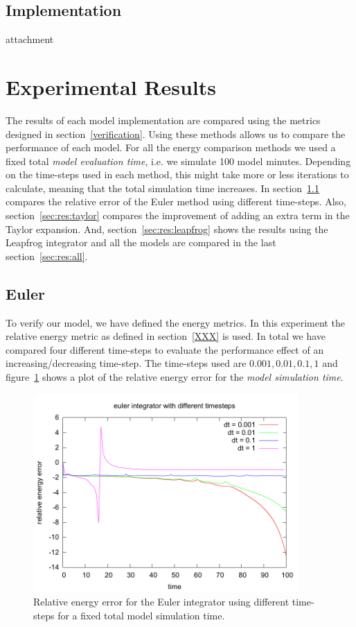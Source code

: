 \documentclass[11pt]{article} %
\begin{document}
\subsection{Implementation}
attachment
\section{Experimental Results}
\label{sec:results}
The results of each model implementation are compared using the metrics designed in section~\ref{verification}. Using these methods allows us to compare the performance of each model. For all the energy comparison methods we used a fixed total \textit{model evaluation time}, i.e. we simulate 100 model minutes. Depending on the time-steps used in each method, this might take more or less iterations to calculate, meaning that the total simulation time increases. In
section~\ref{sec:res:euler} compares the relative error of the Euler method using different time-steps. Also, section~\ref{sec:res:taylor} compares the improvement of adding an extra term in the Taylor expansion. And, section~\ref{sec:res:leapfrog} shows the results using the Leapfrog integrator and all the models are compared in the last section~\ref{sec:res:all}.

\subsection{Euler}
\label{sec:res:euler}
To verify our model, we have defined the energy metrics. In this experiment the relative energy metric as defined in section~\ref{XXX} is used. In total we have compared four different time-steps to evaluate the performance effect of an increasing/decreasing time-step. The time-steps used are $0.001, 0.01, 0.1, 1$ and figure~\ref{fig:euler} shows a plot of the relative energy error for the \textit{model simulation time}. 
\begin{figure}
\label{fig:euler}
    \includegraphics[width=0.9\textwidth]{euler_different_timesteps.png}
    \caption{Relative energy error for the Euler integrator using different time-steps for a fixed total model simulation time.}
\end{figure}
\end{document}
